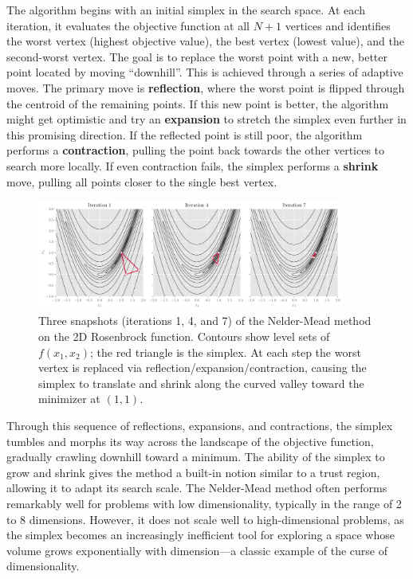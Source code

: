 The algorithm begins with an initial simplex in the search space. At each iteration, it evaluates the objective function at all $N+1$ vertices and identifies the worst vertex (highest objective value), the best vertex (lowest value), and the second-worst vertex. The goal is to replace the worst point with a new, better point located by moving ``downhill''. This is achieved through a series of adaptive moves. The primary move is \textbf{reflection}, where the worst point is flipped through the centroid of the remaining points. If this new point is better, the algorithm might get optimistic and try an \textbf{expansion} to stretch the simplex even further in this promising direction. If the reflected point is still poor, the algorithm performs a \textbf{contraction}, pulling the point back towards the other vertices to search more locally. If even contraction fails, the simplex performs a \textbf{shrink} move, pulling all points closer to the single best vertex.

\begin{figure}[H]
    \centering
    \includegraphics[width=0.9\textwidth]{figs/optimization/nelder_mead_3panel.pdf}
    \caption{Three snapshots (iterations 1, 4, and 7) of the Nelder-Mead method on the 2D Rosenbrock function. Contours show level sets of $f(x_1,x_2)$; the red triangle is the simplex. At each step the worst vertex is replaced via reflection/expansion/contraction, causing the simplex to translate and shrink along the curved valley toward the minimizer at $(1,1)$.}
    \label{fig:nelder-mead-3d}
\end{figure}

Through this sequence of reflections, expansions, and contractions, the simplex tumbles and morphs its way across the landscape of the objective function, gradually crawling downhill toward a minimum. The ability of the simplex to grow and shrink gives the method a built-in notion similar to a trust region, allowing it to adapt its search scale. The Nelder-Mead method often performs remarkably well for problems with low dimensionality, typically in the range of 2 to 8 dimensions. However, it does not scale well to high-dimensional problems, as the simplex becomes an increasingly inefficient tool for exploring a space whose volume grows exponentially with dimension---a classic example of the curse of dimensionality.

